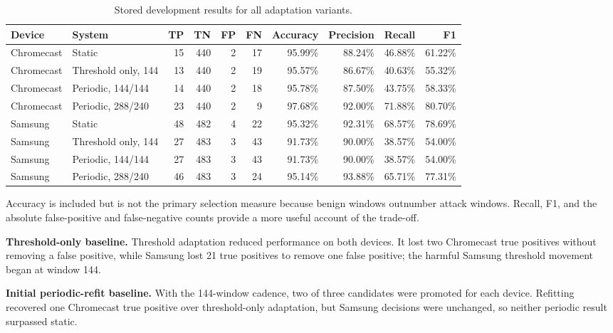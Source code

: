 \documentclass[11pt,a4paper]{article}
\begin{document}
\begin{table}
\centering
\small
\begin{tabular}{llrrrrrrrr}
\toprule
\textbf{Device} & \textbf{System} & \textbf{TP} & \textbf{TN} &
\textbf{FP} & \textbf{FN} & \textbf{Accuracy} & \textbf{Precision} &
\textbf{Recall} & \textbf{F1} \\
\midrule
Chromecast & Static & 15 & 440 & 2 & 17 & 95.99\% & 88.24\% & 46.88\% & 61.22\% \\
Chromecast & Threshold only, 144 & 13 & 440 & 2 & 19 & 95.57\% & 86.67\% & 40.63\% & 55.32\% \\
Chromecast & Periodic, 144/144 & 14 & 440 & 2 & 18 & 95.78\% & 87.50\% & 43.75\% & 58.33\% \\
Chromecast & Periodic, 288/240 & 23 & 440 & 2 & 9 & 97.68\% & 92.00\% & 71.88\% & 80.70\% \\
\midrule
Samsung & Static & 48 & 482 & 4 & 22 & 95.32\% & 92.31\% & 68.57\% & 78.69\% \\
Samsung & Threshold only, 144 & 27 & 483 & 3 & 43 & 91.73\% & 90.00\% & 38.57\% & 54.00\% \\
Samsung & Periodic, 144/144 & 27 & 483 & 3 & 43 & 91.73\% & 90.00\% & 38.57\% & 54.00\% \\
Samsung & Periodic, 288/240 & 46 & 483 & 3 & 24 & 95.14\% & 93.88\% & 65.71\% & 77.31\% \\
\bottomrule
\end{tabular}
\caption{Stored development results for all adaptation variants.}
\label{tab:all-results}
\end{table}

Accuracy is included but is not the primary selection measure because benign
windows outnumber attack windows. Recall, F1, and the absolute false-positive
and false-negative counts provide a more useful account of the trade-off.

\textbf{Threshold-only baseline.} Threshold adaptation reduced performance on
both devices. It lost two Chromecast true positives without removing a false
positive, while Samsung lost 21 true positives to remove one false positive;
the harmful Samsung threshold movement began at window 144.

\textbf{Initial periodic-refit baseline.} With the 144-window cadence, two of
three candidates were promoted for each device. Refitting recovered one
Chromecast true positive over threshold-only adaptation, but Samsung decisions
were unchanged, so neither periodic result surpassed static.
\end{document}
